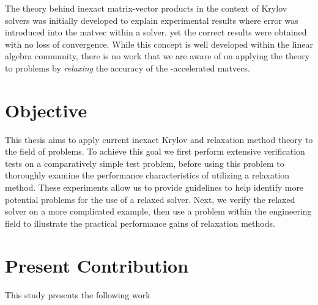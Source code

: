The theory behind inexact matrix-vector products in the context of Krylov solvers \cite{simonciniszyld2003,bourasfraysse2005} was initially developed to explain experimental results where error was introduced into the matvec within a solver, yet the correct results were obtained with no loss of convergence. While this concept is well developed within the linear algebra community, there is no work that we are aware of on applying the theory to {\fmmbem} problems by \emph{relaxing} the accuracy of the {\fmm}-accelerated matvecs.


\section{Objective}\label{sec:objective}

This thesis aims to apply current inexact Krylov and relaxation method theory to the field of {\fmmbem} problems. To achieve this goal we first perform extensive verification tests on a comparatively simple test problem, before using this problem to thoroughly examine the performance characteristics of utilizing a relaxation method. These experiments allow us to provide guidelines to help identify more potential problems for the use of a relaxed solver. Next, we verify the relaxed solver on a more complicated example, then use a problem within the engineering field to illustrate the practical performance gains of relaxation methods.

\section{Present Contribution}\label{sec:present_contribution}

This study presents the following work

